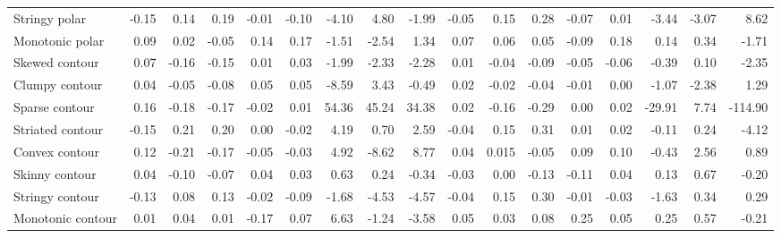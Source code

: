 \documentclass{article}
\begin{document}
\begin{table}[!ht]
{\begin{tabular}{lrrrrrrrrrrrrrrrr}
Stringy polar                                                               & -0.15 & 0.14  & 0.19  & -0.01 & -0.10 & -4.10      & 4.80       & -1.99       & -0.05 & 0.15  & 0.28  & -0.07 & 0.01  & -3.44      & -3.07      & 8.62        \\
Monotonic polar                                                             & 0.09  & 0.02  & -0.05 & 0.14  & 0.17  & -1.51      & -2.54      & 1.34        & 0.07  & 0.06  & 0.05  & -0.09 & 0.18  & 0.14      & 0.34      & -1.71       \\
Skewed contour                                                              & 0.07  & -0.16 & -0.15 & 0.01  & 0.03  & -1.99      & -2.33     & -2.28       & 0.01  & -0.04 & -0.09 & -0.05 & -0.06 & -0.39     & 0.10      & -2.35       \\
Clumpy contour                                                              & 0.04  & -0.05 & -0.08 & 0.05  & 0.05  & -8.59      & 3.43       & -0.49      & 0.02  & -0.02 & -0.04 & -0.01 & 0.00  & -1.07      & -2.38      & 1.29        \\
Sparse contour                                                              & 0.16  & -0.18 & -0.17 & -0.02 & 0.01  & 54.36       & 45.24       & 34.38        & 0.02  & -0.16 & -0.29 & 0.00 & 0.02  & -29.91      & 7.74       & -114.90       \\
Striated contour                                                            & -0.15 & 0.21  & 0.20  & 0.00 & -0.02 & 4.19       & 0.70      & 2.59        & -0.04 & 0.15  & 0.31  & 0.01  & 0.02  & -0.11     & 0.24      & -4.12       \\
Convex contour                                                              & 0.12 & -0.21 & -0.17 & -0.05 & -0.03 & 4.92       & -8.62     & 8.77        & 0.04  & 0.015  & -0.05 & 0.09  & 0.10  & -0.43     & 2.56       & 0.89       \\
Skinny contour                                                              & 0.04  & -0.10 & -0.07 & 0.04  & 0.03  & 0.63      & 0.24      & -0.34      & -0.03 & 0.00  & -0.13 & -0.11 & 0.04  & 0.13      & 0.67      & -0.20      \\
Stringy contour                                                             & -0.13 & 0.08  & 0.13  & -0.02 & -0.09 & -1.68      & -4.53      & -4.57       & -0.04 & 0.15  & 0.30  & -0.01 & -0.03 & -1.63      & 0.34      & 0.29       \\
Monotonic contour                                                           & 0.01  & 0.04  & 0.01  & -0.17 & 0.07  & 6.63       & -1.24      & -3.58       & 0.05  & 0.03  & 0.08  & 0.25  & 0.05  & 0.25      & 0.57      & -0.21      \\

\end{tabular}}
\end{table}
\end{document}
